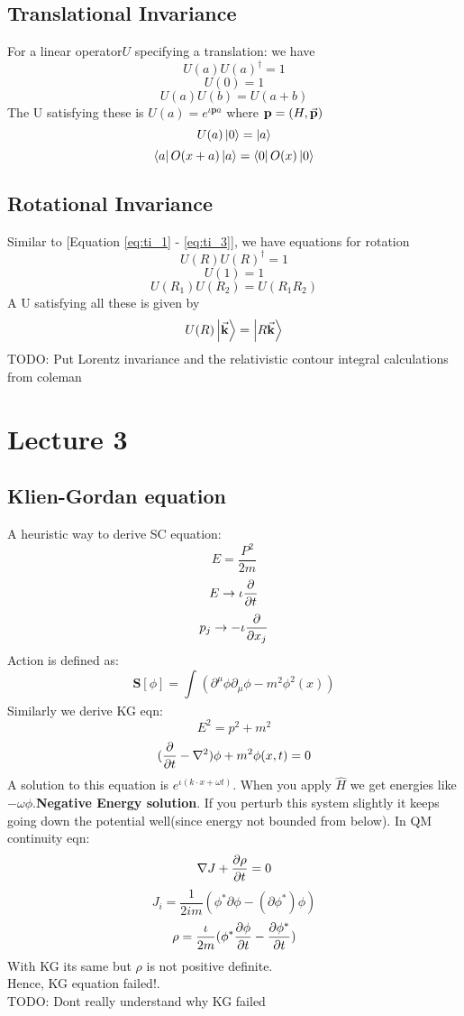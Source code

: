 \documentclass{scrartcl}
\begin{document}
\subsection{Translational Invariance}
For a linear operator\( U \) specifying a translation: we have
\begin{equation}
	U(a)U(a)^\dagger = 1
	\label{eq:ti_1}
\end{equation}
\begin{equation}
	U(0) = 1
	\label{eq:ti_2}
\end{equation}
\begin{equation}
	U(a)U(b) = U(a+b)
	\label{eq:ti_3}
\end{equation}
The U satisfying these is \( U(a) = e^{\iota \mathbf{p} a} \) where \( \mathbf{p} = (H,\va{p}) \) \\
\[ U(a)\ket{0} = \ket{a} \]
\[ \bra{a}O(x+a)\ket{a} = \bra{0}O(x)\ket{0} \]
\subsection{Rotational Invariance}
Similar to [Equation \ref{eq:ti_1} - \ref{eq:ti_3}], we have equations for rotation
\begin{equation}
	U(R)U(R)^\dagger = 1
	\label{eq:ri_1}
\end{equation}
\begin{equation}
	U(1) = 1
	\label{eq:ri_2}
\end{equation}
\begin{equation}
	U(R_1)U(R_2) = U(R_1 R_2)
	\label{eq:ri_3}
\end{equation}
A U satisfying all these is given by 
\[ U(R)\ket{\va{k}} = \ket{R \va{k}} \]
TODO: Put Lorentz invariance and the relativistic contour integral calculations from coleman
\section{Lecture 3}
\subsection{Klien-Gordan equation}
A heuristic way to derive SC equation:
\[ E = \displaystyle\frac{P^2}{2m} \]
\[ E \rightarrow \iota \pdv{}{t} \]
\[ p_j \rightarrow - \iota \pdv{}{x_j} \]
Action is defined as:
\[ \mathbf{S}[\phi] = \displaystyle\int_{}^{}(\partial^\mu \phi \partial_\mu \phi - m^2 \phi^2(x)) \]
Similarly we derive KG eqn:
\[ E^2 = p^2 + m^2 \]
\[ (\pdv{}{t} - \nabla^2)\phi + m^2 \phi(x,t) = 0 \]
A solution to this equation is \( e^{\iota(k \cdot x + \omega t)} \). When you apply \( \hat{H} \) we get energies like \( -\omega \phi \).\textbf{Negative Energy solution}. If you perturb this system slightly it keeps going down the potential well(since energy not bounded from below).  
In QM continuity eqn:
\[ \nabla J + \pdv{\rho}{t} = 0 \]
\[J_i = \frac{ 1 }{ 2im } ( \phi^* \partial \phi - (\partial \phi^*) \phi)\]
\[ \rho = \displaystyle\frac{\iota}{2m}(\phi^* \pdv{\phi}{t} - \pdv{\phi^*}{t}) \]
With KG its same but \( \rho \) is not positive definite.\\
Hence, KG equation failed!.\\
TODO: Dont really understand why KG failed
\end{document}
